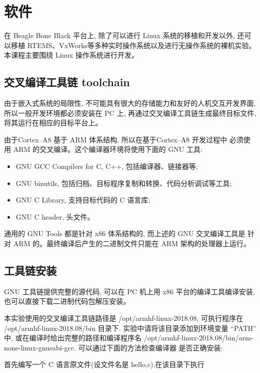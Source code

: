 \section{软件}

在 Beagle Bone Black 平台上, 除了可以进行 Linux 系统的移植和开发以外,
还可以移植 RTEMS、VxWorks等多种实时操作系统以及进行无操作系统的裸机实验。
本课程主要围绕 Linux 操作系统进行开发。

\subsection{交叉编译工具链 toolchain}
由于嵌入式系统的局限性, 不可能具有很大的存储能力和友好的人机交互开发界面,
所以一般开发环境都必须安装在 PC 上, 再通过交叉编译工具链生成最终目标文件,
将其运行在相应的目标平台上。

由于Cortex--A8 基于 ARM 体系结构, 所以在基于Cortex--A8 开发过程中
必须使用 ARM 的交叉编译。这个编译器环境将使用下面的 GNU 工具:
\begin{itemize}
    \item GNU GCC Compilers for C, C++, 包括编译器、链接器等;
    \item GNU binutils, 包括归档、目标程序复制和转换、代码分析调试等工具;
    \item GNU C Library, 支持目标代码的 C 语言库;
    \item GNU C header, 头文件。
\end{itemize}
通用的 GNU Tools 都是针对 x86 体系结构的, 而上述的 GNU 交叉编译工具是
针对 ARM 的。最终编译后产生的二进制文件只能在 ARM 架构的处理器上运行。

\subsection{工具链安装}
GNU 工具链提供完整的源代码, 可以在 PC 机上用 x86 平台的编译工具编译安装,
也可以直接下载二进制代码包解压安装。

本实验使用的交叉编译工具链路径是 /opt/armhf-linux-2018.08, 可执行程序在
/opt/armhf-linux-2018.08/bin 目录下. 实验中请将该目录添加到环境变量 ``PATH''
中, 或在编译时给出完整的路径和编译程序名
/opt/armhf-linux-2018.08/bin/arm-none-linux-gnueabi-gcc. 可以通过下面的方法检查编译器
是否正确安装:

首先编写一个 C 语言原文件(设文件名是 hello.c),在该目录下执行


